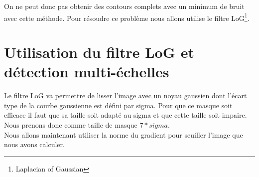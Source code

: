 \documentclass[a4paper,11pt]{article}
\begin{document}
  On ne peut donc pas obtenir des contours complets avec un minimum de bruit avec cette méthode. Pour résoudre ce problème
  nous allons utilise le filtre LoG\footnote{Laplacian of Gaussian}.
  
  \section{Utilisation du filtre LoG et détection multi-échelles}
  Le filtre LoG va permettre de lisser l'image avec un noyau gaussien dont l'écart type de la courbe gaussienne est défini par
  sigma. Pour que ce masque soit efficace il faut que sa taille soit adapté au sigma et que cette taille soit impaire. Nous prenons
  donc comme taille de masque $7*sigma$.\\
  
  Nous allons maintenant utiliser la norme du gradient pour seuiller l'image que nous avons calculer.
\end{document}
